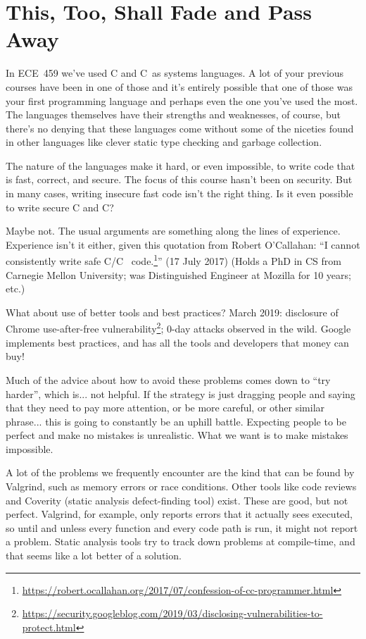 \documentclass[a4paper]{report}
\newcommand{\CPP}{C\nolinebreak\hspace{-.05em}\raisebox{.4ex}{\tiny\bf +}\nolinebreak\hspace{-.10em}\raisebox{.4ex}{\tiny\bf +}}
\def\CPP{{C\nolinebreak[4]\hspace{-.05em}\raisebox{.4ex}{\tiny\bf ++}}}
\begin{document}

\section*{This, Too, Shall Fade and Pass Away}
In ECE~459 we've used C and \CPP~as systems languages. A lot of your previous courses have been in one of those and it's entirely possible that one of those was your first programming language and perhaps even the one you've used the most. The languages themselves have their strengths and weaknesses, of course, but there's no denying that these languages come without some of the niceties found in other languages like clever static type checking and garbage collection.


The nature of the languages make it hard, or even impossible, to write code that is fast, correct, and secure. The focus of this course hasn't been on security. But in many cases, writing insecure fast code isn't the right thing. Is it even possible to write secure C and \CPP?

Maybe not. The usual arguments are something along the lines of experience. Experience isn't it either, given this quotation from Robert O'Callahan: ``I cannot consistently write safe C/\CPP~ code.\footnote{\url{https://robert.ocallahan.org/2017/07/confession-of-cc-programmer.html}}'' (17 July 2017) (Holds a PhD in CS from Carnegie Mellon University; was Distinguished Engineer at Mozilla for 10 years; etc.)

What about use of better tools and best practices? March 2019: disclosure of Chrome use-after-free vulnerability\footnote{\url{https://security.googleblog.com/2019/03/disclosing-vulnerabilities-to-protect.html}}; 0-day attacks
observed in the wild. Google implements best practices, and has all the tools and developers that
money can buy!

Much of the advice about how to avoid these problems comes down to ``try harder'', which is... not helpful. If the strategy is just dragging people and saying that they need to pay more attention, or be more careful, or other similar phrase... this is going to constantly be an uphill battle. Expecting people to be perfect and make no mistakes is unrealistic. What we want is to make mistakes impossible.

A lot of the problems we frequently encounter are the kind that can be found by Valgrind, such as memory errors or race conditions. Other tools like code reviews and Coverity (static analysis defect-finding tool) exist. These are good, but not perfect. Valgrind, for example, only reports errors that it actually sees executed, so until and unless every function and every code path is run, it might not report a problem. Static analysis tools try to track down problems at compile-time, and that seems like a lot better of a solution.
\end{document}
